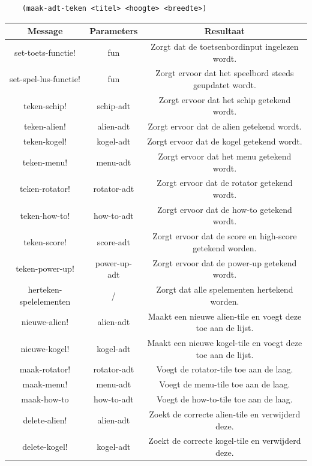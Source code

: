 \documentclass[]{article}
\begin{document}
\begin{center}
	\begin{lstlisting}
	(maak-adt-teken <titel> <hoogte> <breedte>)
	\end{lstlisting}
	\begin{tabular}{|c|c|c|}
		\hline  \textbf{Message} &\textbf{Parameters} & \textbf{Resultaat}  \\
		\hline  set-toets-functie! & fun &Zorgt dat de toetsenbordinput ingelezen wordt. \\
		\hline set-spel-lus-functie! &fun & Zorgt ervoor dat het speelbord steeds geupdatet wordt. \\
		\hline teken-schip! & schip-adt &Zorgt ervoor dat het schip getekend wordt. \\
		\hline teken-alien! & alien-adt &Zorgt ervoor dat de alien getekend wordt. \\
		\hline teken-kogel! & kogel-adt &Zorgt ervoor dat de kogel getekend wordt. \\
		\hline teken-menu! & menu-adt &Zorgt ervoor dat het menu getekend wordt. \\
		\hline teken-rotator! & rotator-adt &Zorgt ervoor dat de rotator getekend wordt. \\
		\hline teken-how-to! & how-to-adt &Zorgt ervoor dat de how-to getekend wordt. \\
		\hline teken-score! & score-adt &Zorgt ervoor dat de score en high-score getekend worden. \\
		\hline teken-power-up! & power-up-adt & Zorgt ervoor dat de power-up getekend wordt. \\
		\hline herteken-spelelementen & / & Zorgt dat alle spelementen hertekend worden. \\
		\hline nieuwe-alien! & alien-adt & Maakt een nieuwe alien-tile en voegt deze toe aan de lijst. \\
		\hline nieuwe-kogel! & kogel-adt &  Maakt een nieuwe kogel-tile en voegt deze toe aan de lijst.\\
		\hline maak-rotator! &rotator-adt& Voegt de rotator-tile toe aan de laag. \\
		\hline maak-menu! &menu-adt& Voegt de menu-tile toe aan de laag. \\
		\hline maak-how-to &how-to-adt& Voegt de how-to-tile toe aan de laag. \\
		\hline delete-alien! & alien-adt & Zoekt de correcte alien-tile en verwijderd deze. \\
		\hline delete-kogel! & kogel-adt & Zoekt de correcte kogel-tile en verwijderd deze. \\

\end{tabular}
\end{center}
\end{document}
